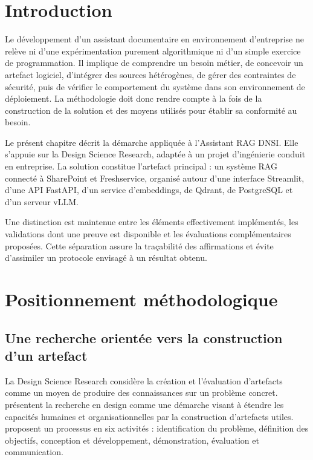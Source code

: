 \section{Introduction}

Le développement d'un assistant documentaire en environnement d'entreprise ne relève ni d'une expérimentation purement algorithmique ni d'un simple exercice de programmation. Il implique de comprendre un besoin métier, de concevoir un artefact logiciel, d'intégrer des sources hétérogènes, de gérer des contraintes de sécurité, puis de vérifier le comportement du système dans son environnement de déploiement. La méthodologie doit donc rendre compte à la fois de la construction de la solution et des moyens utilisés pour établir sa conformité au besoin.

Le présent chapitre décrit la démarche appliquée à l'Assistant RAG DNSI. Elle s'appuie sur la Design Science Research, adaptée à un projet d'ingénierie conduit en entreprise. La solution constitue l'artefact principal : un système RAG connecté à SharePoint et Freshservice, organisé autour d'une interface Streamlit, d'une API FastAPI, d'un service d'embeddings, de Qdrant, de PostgreSQL et d'un serveur vLLM.

Une distinction est maintenue entre les éléments effectivement implémentés, les validations dont une preuve est disponible et les évaluations complémentaires proposées. Cette séparation assure la traçabilité des affirmations et évite d'assimiler un protocole envisagé à un résultat obtenu.

\section{Positionnement méthodologique}

\subsection{Une recherche orientée vers la construction d'un artefact}

La Design Science Research considère la création et l'évaluation d'artefacts comme un moyen de produire des connaissances sur un problème concret. \citet{Hevner2004} présentent la recherche en design comme une démarche visant à étendre les capacités humaines et organisationnelles par la construction d'artefacts utiles. \citet{Peffers2007} proposent un processus en six activités : identification du problème, définition des objectifs, conception et développement, démonstration, évaluation et communication.

